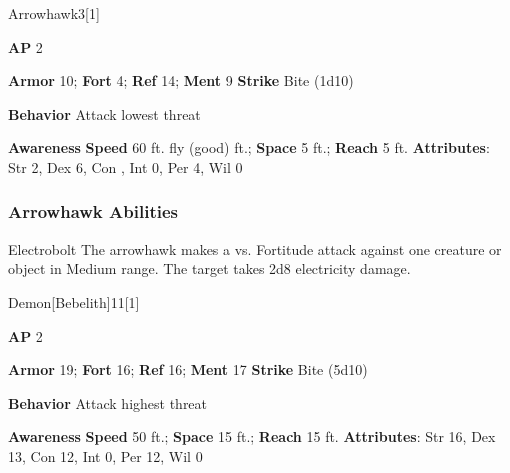 \begin{monsection}{Arrowhawk}{3}[1]
\vspace{-1em}\vspace{-1em}
\begin{spellcontent}
\begin{spelltargetinginfo}
{\textbf{AP} 2}

\pari \textbf{Armor} 10;
\textbf{Fort} 4;
\textbf{Ref} 14;
\textbf{Ment} 9
\pari \textbf{Strike} Bite  (1d10)



\pari \textbf{Behavior} Attack lowest threat
\end{spelltargetinginfo}
\end{spellcontent}

\begin{monsterfooter}
\pari \textbf{Awareness} 
\pari \textbf{Speed} 60 ft. fly (good) ft.;
\textbf{Space} 5 ft.;
\textbf{Reach} 5 ft.
\pari \textbf{Attributes}:
Str 2,
Dex 6,
Con ,
Int 0,
Per 4,
Wil 0
\end{monsterfooter}
\end{monsection}


\subsubsection{Arrowhawk Abilities}

\begin{freeability}{Electrobolt}
The arrowhawk makes a  vs. Fortitude attack against one creature or object in Medium range.
\hit The target takes 2d8 electricity damage.
\end{freeability}

\begin{monsection}{Demon}[Bebelith]{11}[1]
\vspace{-1em}\vspace{-1em}
\begin{spellcontent}
\begin{spelltargetinginfo}
{\textbf{AP} 2}

\pari \textbf{Armor} 19;
\textbf{Fort} 16;
\textbf{Ref} 16;
\textbf{Ment} 17
\pari \textbf{Strike} Bite  (5d10)



\pari \textbf{Behavior} Attack highest threat
\end{spelltargetinginfo}
\end{spellcontent}

\begin{monsterfooter}
\pari \textbf{Awareness} 
\pari \textbf{Speed} 50 ft.;
\textbf{Space} 15 ft.;
\textbf{Reach} 15 ft.
\pari \textbf{Attributes}:
Str 16,
Dex 13,
Con 12,
Int 0,
Per 12,
Wil 0
\end{monsterfooter}
\end{monsection}


